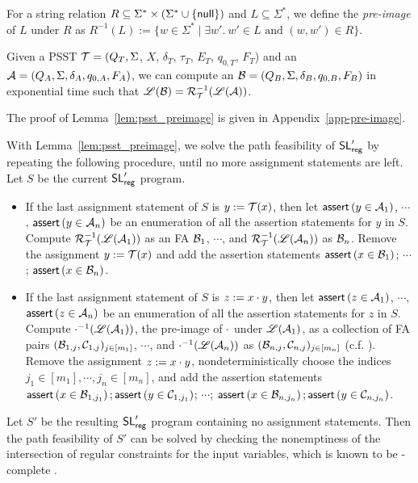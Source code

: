 \begin{definition}
For a string relation $R \subseteq \Sigma^* \times (\Sigma^* \cup \{\mathsf{null}\})$ and $L \subseteq \Sigma^*$, we define the \emph{pre-image} of $L$ under $R$ as $R^{-1}(L):=\{w \in \Sigma^* \mid \exists w'.\ w' \in L \mbox{ and } (w, w') \in R\}$. 
\end{definition}
 
\begin{lemma}
  \label{lem:psst_preimage}
  Given a PSST $\mathcal{T} = (Q_T, \Sigma$, $X$, $\delta_T$, $\tau_T$, $E_T$,  $q_{0, T}$, $F_T$) and an \FA{} $\mathcal{A}
  = (Q_A, \Sigma, \delta_A, q_{0, A}, F_A)$, we can compute an \FA{} $\mathcal{B} = (Q_B,
  \Sigma, \delta_B, q_{0, B}, F_B)$ in exponential time  such that $\mathscr{L}(\mathcal{B}) = \mathcal{R}^{-1}_{\mathcal{T}}(\mathscr{L}(\mathcal{A}))$.
\end{lemma}
The proof of Lemma~\ref{lem:psst_preimage} is given in Appendix~\ref{app-pre-image}.


With Lemma~\ref{lem:psst_preimage}, we  solve the path feasibility of $\mathsf{SL}'_{\sf reg}$ by repeating the following procedure, until no more assignment statements are left. Let $S$ be the current $\mathsf{SL}'_{\sf reg}$ program.
\begin{itemize}
\item If the last assignment statement of $S$ is $y:=\mathcal{T}(x)$, then let $\textsf{assert}\left(y \in \mathcal{A}_1\right)$, $\cdots$, $\textsf{assert}\left(y \in \mathcal{A}_n\right)$ be an enumeration of all the assertion statements for $y$ in $S$. Compute $\mathcal{R}^{-1}_{\mathcal{T}}(\mathscr{L}(\mathcal{A}_1))$ as an FA $\mathcal{B}_1$, $\cdots$, and $\mathcal{R}^{-1}_{\mathcal{T}}(\mathscr{L}(\mathcal{A}_n))$ as $\mathcal{B}_n$. Remove  the assignment  $y:=\mathcal{T}(x)$ and add the assertion statements $\textsf{assert}\left(x \in \mathcal{B}_1\right)$; $\cdots$; $\textsf{assert}\left(x \in \mathcal{B}_n\right)$. 
%
\item If the last assignment statement of $S$ is $z:=x \cdot y$, then let $\textsf{assert}\left(z \in \mathcal{A}_1\right)$, $\cdots$, $\textsf{assert}\left(z \in \mathcal{A}_n\right)$ be an enumeration of all the assertion statements for $z$ in $S$. Compute $\cdot^{-1}(\mathscr{L}(\mathcal{A}_1))$, the pre-image of $\cdot$ under $\mathscr{L}(\mathcal{A}_1)$, as a collection of FA pairs $(\mathcal{B}_{1,j}, \mathcal{C}_{1,j})_{j \in [m_1]}$, $\cdots$, and $\cdot^{-1}(\mathscr{L}(\mathcal{A}_n))$ as $(\mathcal{B}_{n, j}, \mathcal{C}_{n,j})_{j \in [m_n]}$ (c.f. \cite{CHL+19}). Remove the assignment $z:=x \cdot y$, nondeterministically choose the indices $j_1 \in [m_1], \cdots, j_n \in [m_n]$, and add the assertion statements $\textsf{assert}\left(x \in \mathcal{B}_{1,j_1}\right); \textsf{assert}\left(y \in \mathcal{C}_{1, j_1}\right)$; $\cdots$; $\textsf{assert}\left(x \in \mathcal{B}_{n,j_n}\right); \textsf{assert}\left(y \in \mathcal{C}_{n, j_n}\right)$. 
\end{itemize}
Let $S'$ be the resulting $\mathsf{SL}'_{\sf reg}$ program containing no assignment statements. Then the path feasibility of $S'$ can be solved by checking the nonemptiness of the intersection of regular constraints for the input variables, which is known to be \pspace-complete \cite{Kozen77}.

